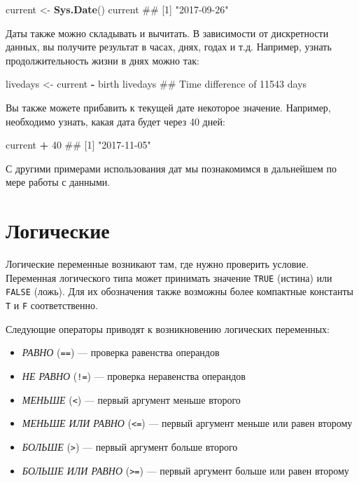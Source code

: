 \documentclass[]{book}
\newenvironment{Shaded}{\begin{snugshade}}{\end{snugshade}}
\newcommand{\KeywordTok}[1]{\textcolor[rgb]{0.13,0.29,0.53}{\textbf{#1}}}
\newcommand{\DecValTok}[1]{\textcolor[rgb]{0.00,0.00,0.81}{#1}}
\newcommand{\StringTok}[1]{\textcolor[rgb]{0.31,0.60,0.02}{#1}}
\newcommand{\OperatorTok}[1]{\textcolor[rgb]{0.81,0.36,0.00}{\textbf{#1}}}
\newcommand{\NormalTok}[1]{#1}
\providecommand{\tightlist}{%
  \setlength{\itemsep}{0pt}\setlength{\parskip}{0pt}}
\begin{document}
\begin{Shaded}
\begin{Highlighting}[]
\NormalTok{current <-}\StringTok{ }\KeywordTok{Sys.Date}\NormalTok{()}
\NormalTok{current}
\NormalTok{## [1] "2017-09-26"}
\end{Highlighting}
\end{Shaded}

Даты также можно складывать и вычитать. В зависимости от дискретности
данных, вы получите результат в часах, днях, годах и т.д. Например,
узнать продолжительность жизни в днях можно так:

\begin{Shaded}
\begin{Highlighting}[]
\NormalTok{livedays <-}\StringTok{ }\NormalTok{current }\OperatorTok{-}\StringTok{ }\NormalTok{birth}
\NormalTok{livedays}
\NormalTok{## Time difference of 11543 days}
\end{Highlighting}
\end{Shaded}

Вы также можете прибавить к текущей дате некоторое значение. Например,
необходимо узнать, какая дата будет через 40 дней:

\begin{Shaded}
\begin{Highlighting}[]
\NormalTok{current }\OperatorTok{+}\StringTok{ }\DecValTok{40}
\NormalTok{## [1] "2017-11-05"}
\end{Highlighting}
\end{Shaded}

С другими примерами использования дат мы познакомимся в дальнейшем по
мере работы с данными.

\section{Логические}\label{booleans}

Логические переменные возникают там, где нужно проверить условие.
Переменная логического типа может принимать значение \texttt{TRUE}
(истина) или \texttt{FALSE} (ложь). Для их обозначения также возможны
более компактные константы \texttt{T} и \texttt{F} соответственно.

Следующие операторы приводят к возникновению логических переменных:

\begin{itemize}
\tightlist
\item
  \emph{РАВНО} (\texttt{==}) --- проверка равенства операндов
\item
  \emph{НЕ РАВНО} (\texttt{!=}) --- проверка неравенства операндов
\item
  \emph{МЕНЬШЕ} (\texttt{\textless{}}) --- первый аргумент меньше
  второго
\item
  \emph{МЕНЬШЕ ИЛИ РАВНО} (\texttt{\textless{}=}) --- первый аргумент
  меньше или равен второму
\item
  \emph{БОЛЬШЕ} (\texttt{\textgreater{}}) --- первый аргумент больше
  второго
\item
  \emph{БОЛЬШЕ ИЛИ РАВНО} (\texttt{\textgreater{}=}) --- первый аргумент
  больше или равен второму
\end{itemize}
\end{document}
